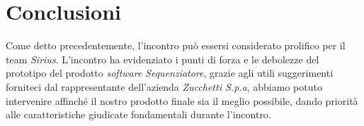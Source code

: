 \section{Conclusioni}
Come detto precedentemente, l'incontro può essersi considerato prolifico per il team \textit{Sirius}. L'incontro ha evidenziato i punti di forza e le debolezze del prototipo del prodotto \textit{software} \textit{Sequenziatore}, grazie agli utili suggerimenti forniteci dal rappresentante dell'azienda  \textit{Zucchetti S.p.a}, abbiamo potuto intervenire affinché il nostro prodotto finale sia il meglio possibile, dando priorità alle caratteristiche giudicate fondamentali durante l'incontro.